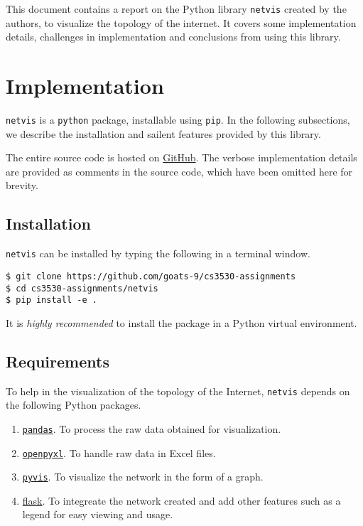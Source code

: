 \documentclass[journal,12pt,twocolumn]{IEEEtran}
\begin{document}
This document contains a report on the Python library \texttt{netvis} created by
the authors, to visualize the topology of the internet. It covers some
implementation details, challenges in implementation and conclusions from using
this library.

\section{Implementation}

\texttt{netvis} is a \texttt{python} package, installable using \texttt{pip}. In
the following subsections, we describe the installation and sailent features
provided by this library.

The entire source code is hosted on
\href{https://github.com/goats-9/cs3530-assignments/tree/main/netvis}{GitHub}.
The verbose implementation details are provided as comments in the source code,
which have been omitted here for brevity.

\subsection{Installation}

\texttt{netvis} can be installed by typing the following in a terminal window.

\begin{lstlisting}
$ git clone https://github.com/goats-9/cs3530-assignments
$ cd cs3530-assignments/netvis
$ pip install -e .
\end{lstlisting}

It is \emph{highly recommended} to install the package in a Python virtual
environment.

\subsection{Requirements}

To help in the visualization of the topology of the Internet, \texttt{netvis}
depends on the following Python packages.
\begin{enumerate}
     \item \href{https://pandas.pydata.org/}{\texttt{pandas}}. To process the
     raw data obtained for visualization.
     \item \href{https://openpyxl.readthedocs.io/en/stable/}{\texttt{openpyxl}}.
     To handle raw data in Excel files.
     \item \href{https://pyvis.readthedocs.io/en/latest/}{\texttt{pyvis}}. To
     visualize the network in the form of a graph.
     \item \href{https://flask.palletsprojects.com/en/2.3.x/}{flask}. To
     integreate the network created and add other features such as a legend for
     easy viewing and usage.
\end{enumerate}
\end{document}
